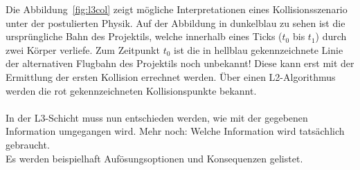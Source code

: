 Die Abbildung~\ref{fig:l3col} zeigt mögliche Interpretationen eines Kollisionsszenario unter der postulierten Physik.
Auf der Abbildung in dunkelblau zu sehen ist die ursprüngliche Bahn des Projektils, welche innerhalb eines Ticks ($t_0$ bis $t_1$) durch zwei Körper verliefe.
Zum Zeitpunkt $t_0$ ist die in hellblau gekennzeichnete Linie der alternativen Flugbahn des Projektils noch unbekannt! Diese kann erst mit der Ermittlung der ersten Kollision errechnet werden.
Über einen L2-Algorithmus werden die rot gekennzeichneten Kollisionspunkte bekannt.\\
\\
In der L3-Schicht muss nun entschieden werden, wie mit der gegebenen Information umgegangen wird. Mehr noch: Welche Information wird tatsächlich gebraucht.\\
Es werden beispielhaft Aufösungsoptionen und Konsequenzen gelistet.
